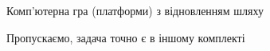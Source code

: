 ﻿\begin{problemAllDefault}{Комп'ютерна гра (платформи) з відновленням шляху}\label{problem:platforms-restore-way}

Пропускаємо, задача точно є в іншому комплекті

\end{problemAllDefault}